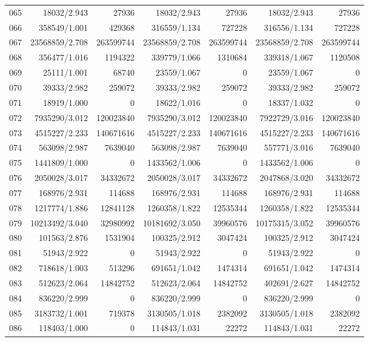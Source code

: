 \begin{longtable}{crrrrrr}
065 & 18032/2.943 & 27936 & 18032/2.943 & 27936 & 18032/2.943 & 27936 \\
066 & 358549/1.001 & 429368 & 316559/1.134 & 727228 & 316556/1.134 & 727228 \\
067 & 23568859/2.708 & 263599744 & 23568859/2.708 & 263599744 & 23568859/2.708 & 263599744 \\
068 & 356477/1.016 & 1194322 & 339779/1.066 & 1310684 & 339318/1.067 & 1120508 \\
069 & 25111/1.001 & 68740 & 23559/1.067 & 0 & 23559/1.067 & 0 \\
070 & 39333/2.982 & 259072 & 39333/2.982 & 259072 & 39333/2.982 & 259072 \\
071 & 18919/1.000 & 0 & 18622/1.016 & 0 & 18337/1.032 & 0 \\
072 & 7935290/3.012 & 120023840 & 7935290/3.012 & 120023840 & 7922729/3.016 & 120023840 \\
073 & 4515227/2.233 & 140671616 & 4515227/2.233 & 140671616 & 4515227/2.233 & 140671616 \\
074 & 563098/2.987 & 7639040 & 563098/2.987 & 7639040 & 557771/3.016 & 7639040 \\
075 & 1441809/1.000 & 0 & 1433562/1.006 & 0 & 1433562/1.006 & 0 \\
076 & 2050028/3.017 & 34332672 & 2050028/3.017 & 34332672 & 2047868/3.020 & 34332672 \\
077 & 168976/2.931 & 114688 & 168976/2.931 & 114688 & 168976/2.931 & 114688 \\
078 & 1217774/1.886 & 12841128 & 1260358/1.822 & 12535344 & 1260358/1.822 & 12535344 \\
079 & 10213492/3.040 & 32980992 & 10181692/3.050 & 39960576 & 10175315/3.052 & 39960576 \\
080 & 101563/2.876 & 1531904 & 100325/2.912 & 3047424 & 100325/2.912 & 3047424 \\
081 & 51943/2.922 & 0 & 51943/2.922 & 0 & 51943/2.922 & 0 \\
082 & 718618/1.003 & 513296 & 691651/1.042 & 1474314 & 691651/1.042 & 1474314 \\
083 & 512623/2.064 & 14842752 & 512623/2.064 & 14842752 & 402691/2.627 & 14842752 \\
084 & 836220/2.999 & 0 & 836220/2.999 & 0 & 836220/2.999 & 0 \\
085 & 3183732/1.001 & 719378 & 3130505/1.018 & 2382092 & 3130505/1.018 & 2382092 \\
086 & 118403/1.000 & 0 & 114843/1.031 & 22272 & 114843/1.031 & 22272 \\

\end{longtable}
